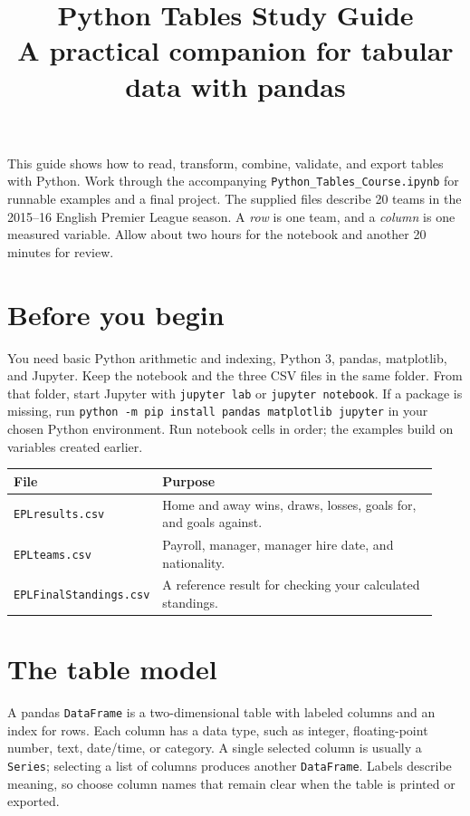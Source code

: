 \documentclass[11pt,letterpaper]{article}
\title{Python Tables Study Guide\\\large A practical companion for tabular data with pandas}
\author{}
\date{}
\begin{document}
\maketitle
\vspace{-2em}

\noindent This guide shows how to read, transform, combine, validate, and export tables with Python. Work through the accompanying \texttt{Python\_Tables\_Course.ipynb} for runnable examples and a final project. The supplied files describe 20 teams in the 2015--16 English Premier League season. A \emph{row} is one team, and a \emph{column} is one measured variable. Allow about two hours for the notebook and another 20 minutes for review.

\section*{Before you begin}
You need basic Python arithmetic and indexing, Python 3, pandas, matplotlib, and Jupyter. Keep the notebook and the three CSV files in the same folder. From that folder, start Jupyter with \texttt{jupyter lab} or \texttt{jupyter notebook}. If a package is missing, run \texttt{python -m pip install pandas matplotlib jupyter} in your chosen Python environment. Run notebook cells in order; the examples build on variables created earlier.

\begin{center}
\begin{tabular}{@{}p{0.28\linewidth}p{0.65\linewidth}@{}}
\toprule
File & Purpose \\
\midrule
\texttt{EPLresults.csv} & Home and away wins, draws, losses, goals for, and goals against. \\
\texttt{EPLteams.csv} & Payroll, manager, manager hire date, and nationality. \\
\texttt{EPLFinalStandings.csv} & A reference result for checking your calculated standings. \\
\bottomrule
\end{tabular}
\end{center}

\section{The table model}
A pandas \texttt{DataFrame} is a two-dimensional table with labeled columns and an index for rows. Each column has a data type, such as integer, floating-point number, text, date/time, or category. A single selected column is usually a \texttt{Series}; selecting a list of columns produces another \texttt{DataFrame}. Labels describe meaning, so choose column names that remain clear when the table is printed or exported.
\end{document}
